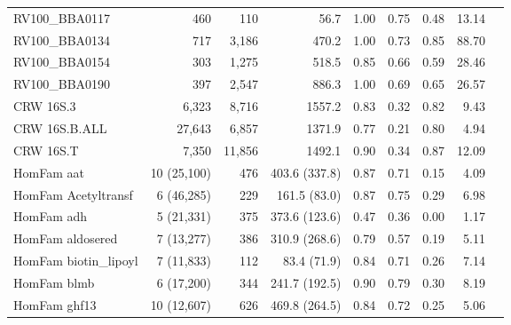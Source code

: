 \begin{table}
{\begin{tabular}{lrrrrrrrr}
RV100\_BBA0117   & 460        & 110   &56.7                       & 1.00            & 0.75           & 0.48           & 13.14          \\
RV100\_BBA0134   & 717        & 3,186      &470.2                   & 1.00            & 0.73           & 0.85           & 88.70          \\
RV100\_BBA0154   & 303        & 1,275            &518.5             & 0.85            & 0.66           & 0.59           & 28.46          \\
RV100\_BBA0190   & 397        & 2,547 &886.3                        & 1.00            & 0.69           & 0.65           & 26.57          \\
\hline
CRW        16S.3            & 6,323       & 8,716      &1557.2                   & 0.83            & 0.32           & 0.82           & 9.43           \\
CRW        16S.B.ALL        & 27,643      & 6,857             &1371.9            & 0.77            & 0.21           & 0.80           & 4.94           \\
CRW        16S.T            & 7,350       & 11,856    &1492.1                    & 0.90            & 0.34           & 0.87           & 12.09          \\
\hline
HomFam        aat              & 10 (25,100)         & 476              &403.6 (337.8)            & 0.87            & 0.71           & 0.15           & 4.09           \\
HomFam        Acetyltransf     & 6 (46,285)        & 229       &161.5 (83.0)                   & 0.87            & 0.75           & 0.29           & 6.98           \\
HomFam        adh              & 5 (21,331)         & 375   &373.6 (123.6)                       & 0.47            & 0.36           & 0.00           & 1.17           \\
HomFam        aldosered        & 7 (13,277)         & 386     &310.9 (268.6)                     & 0.79            & 0.57           & 0.19           & 5.11           \\
HomFam        biotin\_lipoyl   & 7 (11,833)         & 112     &83.4 (71.9)                     & 0.84            & 0.71           & 0.26           & 7.14           \\
HomFam        blmb             & 6 (17,200)         & 344     &241.7 (192.5)                     & 0.90            & 0.79           & 0.30           & 8.19           \\
HomFam        ghf13            & 10 (12,607)        & 626   &469.8 (264.5)                       & 0.84            & 0.72           & 0.25           & 5.06           \\

\end{tabular}}
\end{table}
